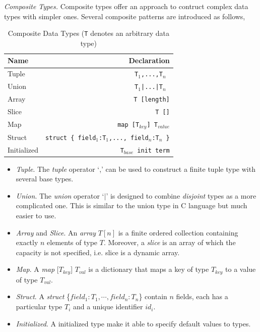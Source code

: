 \noindent\emph{Composite Types.} Composite types offer an approach to contruct complex data types with simpler ones. Several composite patterns are introduced as follows,

\begin{table}
    \caption{Composite Data Types (\texttt{T} denotes an arbitrary data type)}
    \centering
    \begin{tabular}{lr}
        \hline
        Name & Declaration \T\B \\
        \hline
        \T Tuple  & \texttt{T$_1$,...,T$_n$ }\\
        Union & \texttt{T$_1$|...|T$_n$ } \\
        Array & \texttt{T [length]}\\
        Slice & \texttt{T []} \\
        Map & \texttt{map [T$_{key}$] T$_{value}$} \\
        Struct\hspace{1cm} & \texttt{struct \{ field$_1$:T$_1$,..., field$_n$:T$_n$ \}} \\
        \B Initialized & \texttt{T$_{base}$ init term} \\
        \hline
    \end{tabular}
\end{table}

\begin{itemize}
    \item \emph{Tuple}. The \emph{tuple} operator `,' can be used to construct a finite tuple type with several base types.
    \item \emph{Union}. The \emph{union} operator `$|$' is designed to combine \emph{disjoint} types as a more complicated one. This is similar to the union type in C language but much easier to use.
    \item \emph{Array} and \emph{Slice}. An \emph{array} $T[n]$ is a finite ordered collection containing exactly $n$ elements of type $T$. Moreover, a \emph{slice} is an array of which the capacity is not specified, i.e. slice is a dynamic array.
    \item \emph{Map}. A \emph{map }[$T_{key}$] $T_{val}$ is a dictionary that maps a key of type $T_{key}$ to a value of type $T_{val}$.
    \item \emph{Struct}. A \emph{struct }\{$field_1:T_1,\cdots,field_n:T_n$\} contain $n$ fields, each has a particular type $T_i$ and a unique identifier $id_i$.
    \item \emph{Initialized}. A initialized type make it able to specify default values to types.
\end{itemize}

